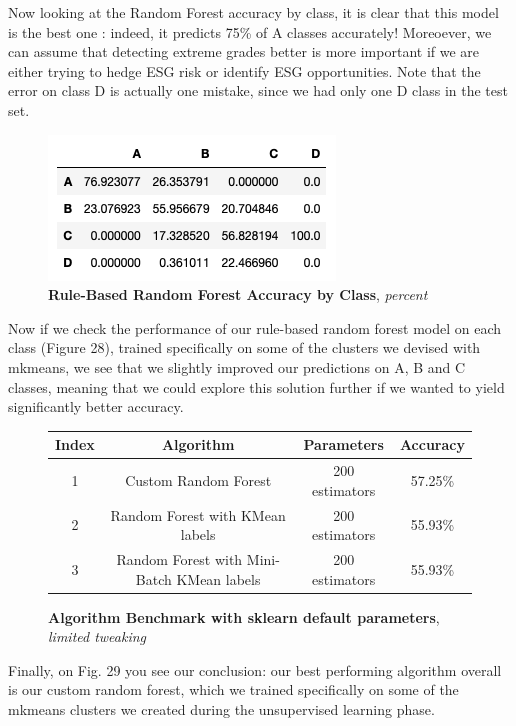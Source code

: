 \documentclass[12pt]{report}
\begin{document}
Now looking at the Random Forest accuracy by class, it is clear that this model is the best one : indeed, it predicts 75\% of A classes accurately! Moreoever, we can assume that detecting extreme grades better is more important if we are either trying to hedge ESG risk or identify ESG opportunities. Note that the error on class D is actually one mistake, since we had only one D class in the test set. 

\begin{figure}[h!]
\centering
\includegraphics[scale=0.7]{rule_benchmark.png}
\caption{\textbf{{Rule-Based Random Forest Accuracy by Class}}, \textit{percent}}
\label{fig:rule_benchmark}
\end{figure}

Now if we check the performance of our rule-based random forest model on each class (Figure 28), trained specifically on some of the clusters we devised with mkmeans, we see that we slightly improved our predictions on A, B and C classes, meaning that we could explore this solution further if we wanted to yield significantly better accuracy.


\begin{figure}[h!]
\begin{center}
\begin{tabular}{ |c|c|c|c| }
\hline
 Index & Algorithm & Parameters & Accuracy \\
 \hline\hline
 1 & Custom Random Forest & 200 estimators & 57.25\% \\  
 2 & Random Forest with KMean labels & 200 estimators & 55.93\% \\
 3 & Random Forest with Mini-Batch KMean labels & 200 estimators & 55.93\% \\
\hline
\end{tabular}
\end{center}
\caption{\textbf{Algorithm Benchmark with sklearn default parameters}, \textit{limited tweaking}}
\label{fig:endbenchmark}
\end{figure}
Finally, on Fig. 29 you see our conclusion: our best performing algorithm overall is our custom random forest, which we trained specifically on some of the mkmeans clusters we created during the unsupervised learning phase. 
\end{document}
